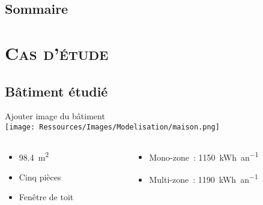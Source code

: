 \documentclass[xcolor=x11names, compress, 11pt]{beamer}
\begin{document}
\subsection{Sommaire}
\begin{frame}[t]
\tableofcontents[hideallsubsections]
\addtocounter{page}{-1}
\end{frame}


















\section{\scshape Cas d’étude}




\subsection{Bâtiment étudié}
\begin{frame}[c]
    \vfill
    \centering
    \alert{Ajouter image du bâtiment} \\
    \texttt{[image: Ressources/Images/Modelisation/maison.png]}
    \begin{columns}
        \begin{column}{0.4\textwidth}
            \centering
            \begin{itemize}
                \item \SI{98.4}{\metre\squared}
                \item Cinq pièces
                \item Fenêtre de toit
            \end{itemize}
        \end{column}%
        \begin{column}{0.7\textwidth}
            \centering
            \begin{itemize}
                \item Mono-zone~: \SI{1150}{kWh\per an}
                \item Multi-zone~: \SI{1190}{kWh\per an}
            \end{itemize}
        \end{column}%
    \end{columns}%
    \vfill
\end{frame}
\end{document}
